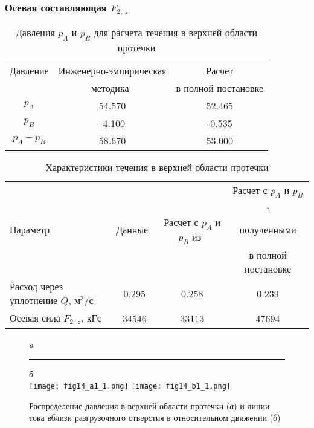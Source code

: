 \subsubsection{Осевая составляющая $F_{2,\,z}$}
\label{s:3612}
\begin{table}[b!]
  \centering\small\caption{Давления $p_A$ и $p_B$ для расчета течения в верхней области протечки}\vspace*{2mm}

  \begin{tabular}{|c|c|c|} \hline
Давление  & Инженерно-эмпирическая & Расчет  \\
  & методика~\cite{mak_pilev} & в полной постановке  \\ \hline
    $p_A$   &                 54.570              &       52.465                \\ %
    $p_B$   &                 -4.100              &       -0.535                \\ %
  $p_A-p_B$ &                 58.670              &       53.000                \\ \hline
    \end{tabular}
  \label{tab3:2}
\end{table}
\begin{table}[b!]
  \centering\small  \caption{Характеристики течения в верхней области протечки}\vspace*{2mm}

  \begin{tabular}{|p{4cm}|c|c|c|} \hline
  &                            &                                          & Расчет с $p_A$ и $p_B$, \\
  Параметр & Данные~\cite{mak_pilev}    & Расчет с $p_A$ и $p_B$ из~\cite{mak_pilev} & полученными  \\
  &                            &                                         & в полной постановке      \\ \hline
Расход через уплотнение $Q$, м$^3$/с  &    0.295     &    0.258    &  0.239     \\ \hline
Осевая сила $F_{2,\,z}$, кГс          &    34546     &    33113    &  47694     \\ \hline
  \end{tabular}
  \label{tab3:3}
\end{table}
\begin{figure}[b!]\vspace*{4mm}
\centering \small \rule{0mm}{0mm}\emph{a}\rule{95mm}{0mm}\emph{б} \\[1.5mm]
  {\texttt{[image: fig14\_a1\_1.png]}}\hfill
  {\texttt{[image: fig14\_b1\_1.png]}}
  \caption{Распределение давления в верхней области протечки ({\it а}) и линии тока вблизи разгрузочного 
  отверстия в относительном движении ({\it б})}
  \label{fig3:14}
\end{figure}

